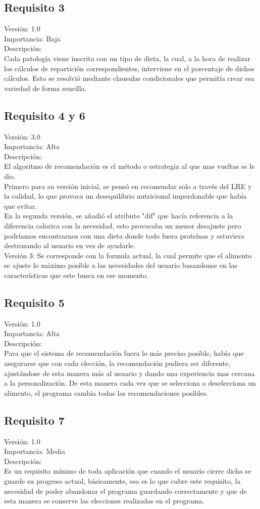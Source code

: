 \subsection{Requisito 3}
Versión: 1.0\\
Importancia: Baja\\
Descripción:\\
Cada patología viene inscrita con un tipo de dieta, la cual, a la hora de realizar los cálculos de repartición correspondientes, interviene en el porcentaje de dichos cálculos. Esto se resolvió mediante clausulas condicionales que permitía crear esa variedad de forma sencilla.
\subsection{Requisito 4 y 6}
Versión: 3.0\\
Importancia: Alta\\
Descripción:\\
El algoritmo de recomendación es el método o estrategia al que mas vueltas se le dio. \\
Primero para su versión inicial, se pensó en recomendar solo a través del LRE y la calidad, lo que provoca un desequilibrio nutricional imperdonable que había que evitar.\\
En la segunda versión, se añadió el atributo "dif" que hacía referencia a la diferencia calorica con la necesidad, esto provocaba un menor desajuste pero podríamos encontrarnos con una dieta donde todo fuera proteínas y estuviera destrozando al usuario en vez de ayudarle.\\
Versión 3: Se corresponde con la formula actual, la cual permite que el alimento se ajuste lo máximo posible a las necesidades del usuario basandonse en las características que este busca en ese momento.
\subsection{Requisito 5}
Versión: 1.0\\
Importancia: Alta\\
Descripción:\\
Para que el sistema de recomendación fuera lo más preciso posible, había que asegurarse que con cada elección, la recomendación pudiera ser diferente, ajustándose de esta manera más al usuario y dando una experiencia mas cercana a la personalización. De esta manera cada vez que se selecciona o deselecciona un alimento, el programa cambia todas las recomendaciones posibles.
\subsection{Requisito 7}
Versión: 1.0\\
Importancia: Media\\
Descripción:\\
Es un requisito mínimo de toda aplicación que cuando el usuario cierre dicha se guarde su progreso actual, básicamente, eso es lo que cubre este requisito, la necesidad de poder abandonar el programa guardando correctamente y que de esta manera se conserve las elecciones realizadas en el programa.
